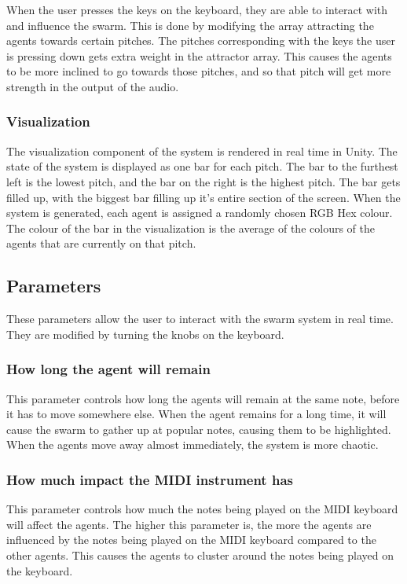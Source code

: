 \documentclass[a4paper,english]{report}
\begin{document}
	When the user presses the keys on the keyboard, they are able to interact with and influence the swarm. This is done by modifying the array attracting the agents towards certain pitches. The pitches corresponding with the keys the user is pressing down gets extra weight in the attractor array. This causes the agents to be more inclined to go towards those pitches, and so that pitch will get more strength in the output of the audio.
	
	\subsubsection{Visualization}
	The visualization component of the system is rendered in real time in Unity. The state of the system is displayed as one bar for each pitch. The bar to the furthest left is the lowest pitch, and the bar on the right is the highest pitch. The bar gets filled up, with the biggest bar filling up it's entire section of the screen. When the system is generated, each agent is assigned a randomly chosen RGB Hex colour. The colour of the bar in the visualization is the average of the colours of the agents that are currently on that pitch.
	
	\subsection{Parameters}
	These parameters allow the user to interact with the swarm system in real time. They are modified by turning the knobs on the keyboard.
	
	\subsubsection{How long the agent will remain}
	This parameter controls how long the agents will remain at the same note, before it has to move somewhere else. When the agent remains for a long time, it will cause the swarm to gather up at popular notes, causing them to be highlighted. When the agents move away almost immediately, the system is more chaotic. 
	
	\subsubsection{How much impact the MIDI instrument has}
	This parameter controls how much the notes being played on the MIDI keyboard will affect the agents. The higher this parameter is, the more the agents are influenced by the notes being played on the MIDI keyboard compared to the other agents. This causes the agents to cluster around the notes being played on the keyboard.
	
\end{document}
